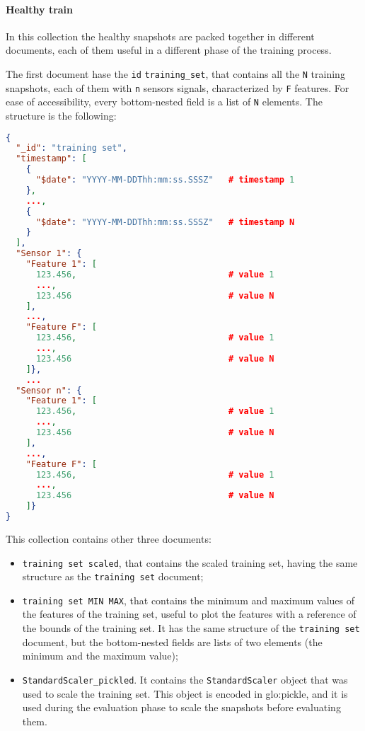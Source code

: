 \paragraph{Healthy train}
In this collection the healthy snapshots are packed together in different documents, each of them useful in a different phase of the training process.

  {The first document hase the \texttt{id} \texttt{training\_set}, that contains all the \texttt{N} training snapshots, each of them with \texttt{n} sensors signals, characterized by \texttt{F} features. For ease of accessibility, every bottom-nested field is a list of \texttt{N} elements. The structure is the following:}

\begin{lstlisting}[language=json,firstnumber=1]
{
  "_id": "training set",
  "timestamp": [
    {
      "$date": "YYYY-MM-DDThh:mm:ss.SSSZ" 	# timestamp 1
    },  
	...,
    {   
      "$date": "YYYY-MM-DDThh:mm:ss.SSSZ" 	# timestamp N
    }
  ],
  "Sensor 1": {
    "Feature 1": [
      123.456,								# value 1
      ...,
      123.456								# value N
    ],
	...,
	"Feature F": [
      123.456,								# value 1
      ...,
      123.456								# value N
    ]},
	...
  "Sensor n": {
    "Feature 1": [
      123.456,								# value 1
      ...,
      123.456								# value N
    ],
	...,
	"Feature F": [
      123.456,								# value 1
      ...,
      123.456								# value N
    ]}
}
\end{lstlisting}

This collection contains other three documents:
\begin{itemize}
  \item \texttt{training set scaled}, that contains the scaled training set, having the same structure as the \texttt{training set} document;
  \item \texttt{training set MIN MAX}, that contains the minimum and maximum values of the features of the training set, useful to plot the features with a reference of the bounds of the training set. It has the same structure of the \texttt{training set} document, but the bottom-nested fields are lists of two elements (the minimum and the maximum value);
  \item \texttt{StandardScaler\_pickled}. It contains the \texttt{StandardScaler} object that was used to scale the training set. This object is encoded in \gls{glo:pickle}, and it is used during the evaluation phase to scale the snapshots before evaluating them.
\end{itemize}

